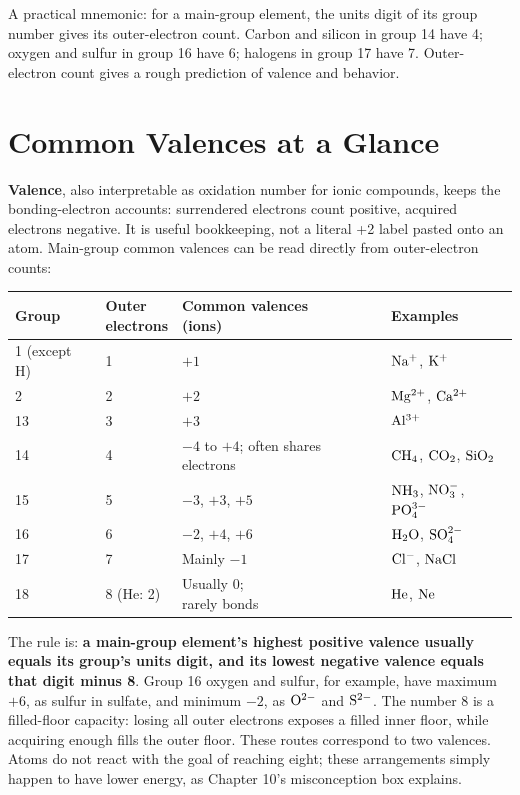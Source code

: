 A practical mnemonic: for a main-group element, the units digit of its group number gives its outer-electron count. Carbon and silicon in group 14 have 4; oxygen and sulfur in group 16 have 6; halogens in group 17 have 7. Outer-electron count gives a rough prediction of valence and behavior.

\section{Common Valences at a Glance}

\textbf{Valence}, also interpretable as oxidation number for ionic compounds, keeps the bonding-electron accounts: surrendered electrons count positive, acquired electrons negative. It is useful bookkeeping, not a literal +2 label pasted onto an atom. Main-group common valences can be read directly from outer-electron counts:

\begin{table}[htbp]
\centering
\begin{tabular}{llll}
\toprule
Group & \shortstack[l]{Outer\\electrons} & \shortstack[l]{Common valences\\(ions)} & Examples \\
\midrule
1 (except H) & 1 & $+1$ & $\mathrm{Na^+}$, $\mathrm{K^+}$ \\
2 & 2 & $+2$ & $\mathrm{Mg^{2+}}$, $\mathrm{Ca^{2+}}$ \\
13 & 3 & $+3$ & $\mathrm{Al^{3+}}$ \\
14 & 4 & \shortstack[l]{$-4$ to $+4$; often\\shares electrons} & $\mathrm{CH_4}$, $\mathrm{CO_2}$, $\mathrm{SiO_2}$ \\
15 & 5 & $-3$, $+3$, $+5$ & $\mathrm{NH_3}$, $\mathrm{NO_3^-}$, $\mathrm{PO_4^{3-}}$ \\
16 & 6 & $-2$, $+4$, $+6$ & $\mathrm{H_2O}$, $\mathrm{SO_4^{2-}}$ \\
17 & 7 & Mainly $-1$ & $\mathrm{Cl^-}$, $\mathrm{NaCl}$ \\
18 & 8 (He: 2) & \shortstack[l]{Usually 0;\\rarely bonds} & $\mathrm{He}$, $\mathrm{Ne}$ \\
\bottomrule
\end{tabular}
\end{table}

The rule is: \textbf{a main-group element's highest positive valence usually equals its group's units digit, and its lowest negative valence equals that digit minus 8}. Group 16 oxygen and sulfur, for example, have maximum $+6$, as sulfur in sulfate, and minimum $-2$, as $\mathrm{O^{2-}}$ and $\mathrm{S^{2-}}$. The number $8$ is a filled-floor capacity: losing all outer electrons exposes a filled inner floor, while acquiring enough fills the outer floor. These routes correspond to two valences. Atoms do not react with the goal of reaching eight; these arrangements simply happen to have lower energy, as Chapter 10's misconception box explains.

